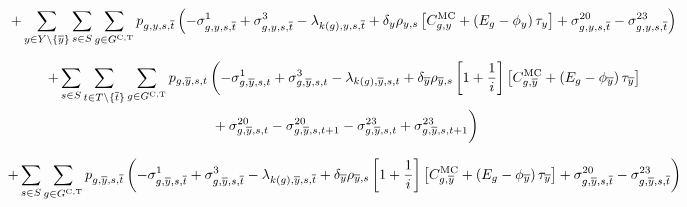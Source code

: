 \documentclass{article}
\begin{document}
\begin{equation}
+ \sum\limits_{\iYear \in \sYears 
	\setminus \{\iYearTerminal\}
}\sum\limits_{\iScenario \in \sScenarios} \sum\limits_{\iGenerator \in \sGeneratorsCandidateThermal} \vPower[\iGenerator,\iYear,\iScenario,\iIntervalTerminal] \left(-\dMinPowerOutput[\iGenerator,\iYear,\iScenario,\iIntervalTerminal] + \dMaxPowerOutputCandidateThermal[\iGenerator,\iYear,\iScenario,\iIntervalTerminal] 
- \dPowerBalance[k(\iGenerator),\iYear,\iScenario,\iIntervalTerminal] + \cDiscountRate \cScenarioDuration \left[\cMarginalCost + \left(\cEmissionsIntensity - \vBaseline\right)\vPermitPrice \right] + \dRampRateUp[\iGenerator,\iYear,\iScenario,\iIntervalTerminal] - \dRampRateDown[\iGenerator,\iYear,\iScenario,\iIntervalTerminal] \right)\\
\end{equation}

\begin{align}
+ \sum\limits_{\iScenario \in \sScenarios} \sum\limits_{\iInterval \in \sIntervals \setminus \{\iIntervalTerminal\}} \sum\limits_{\iGenerator \in \sGeneratorsCandidateThermal} \vPower[\iGenerator,\iYearTerminal,\iScenario,\iInterval] & \left(-\dMinPowerOutput[\iGenerator,\iYearTerminal,\iScenario,\iInterval] + \dMaxPowerOutputCandidateThermal[\iGenerator,\iYearTerminal,\iScenario,\iInterval] - \dPowerBalance[k(\iGenerator),\iYearTerminal,\iScenario,\iInterval] + \cDiscountRate[\iYearTerminal] \cScenarioDuration[\iYearTerminal,\iScenario] \left[1 + \frac{1}{\cInterestRate}\right] \left[\cMarginalCost[\iGenerator,\iYearTerminal] + \left(\cEmissionsIntensity - \vBaseline[\iYearTerminal]\right)\vPermitPrice[\iYearTerminal] \right] \right.\nonumber\\
& \left. \vphantom{1 + \frac{1}{\cInterestRate}} + \dRampRateUp[\iGenerator,\iYearTerminal,\iScenario,\iInterval] - \dRampRateUp[\iGenerator,\iYearTerminal,\iScenario,\iInterval + 1] - \dRampRateDown[\iGenerator,\iYearTerminal,\iScenario,\iInterval] + \dRampRateDown[\iGenerator,\iYearTerminal,\iScenario,\iInterval + 1]
\right)\nonumber\\
\end{align}

\begin{equation}
+ \sum\limits_{\iScenario \in \sScenarios} \sum\limits_{\iGenerator \in \sGeneratorsCandidateThermal} \vPower[\iGenerator,\iYearTerminal,\iScenario,\iIntervalTerminal] \left(-\dMinPowerOutput[\iGenerator,\iYearTerminal,\iScenario,\iIntervalTerminal] + \dMaxPowerOutputCandidateThermal[\iGenerator,\iYearTerminal,\iScenario,\iIntervalTerminal] - \dPowerBalance[k(\iGenerator),\iYearTerminal,\iScenario,\iIntervalTerminal] + \cDiscountRate[\iYearTerminal] \cScenarioDuration[\iYearTerminal,\iScenario] \left[1 + \frac{1}{\cInterestRate}\right] \left[\cMarginalCost[\iGenerator,\iYearTerminal] + \left(\cEmissionsIntensity - \vBaseline[\iYearTerminal]\right)\vPermitPrice[\iYearTerminal] \right] + \dRampRateUp[\iGenerator,\iYearTerminal,\iScenario,\iIntervalTerminal] - \dRampRateDown[\iGenerator,\iYearTerminal,\iScenario,\iIntervalTerminal] \right)
\end{equation}
\end{document}
